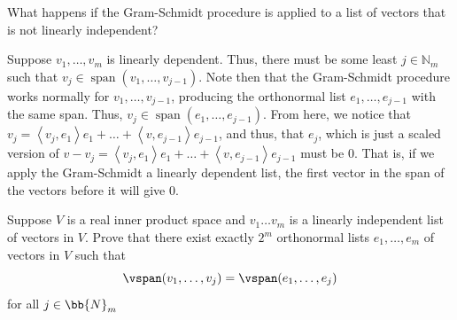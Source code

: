\documentclass[12pt, letterpaper]{hmcpset}
\begin{document}
\pagebreak

\begin{problem}[9]
	What happens if the Gram-Schmidt procedure is applied to a list of vectors that is not linearly independent?
\end{problem}

\begin{solution}
	Suppose $v_1, \dots, v_m$ is linearly dependent. Thus, there must be some least $j \in \mathbb N_m$ such that $v_j \in \operatorname{span}(v_1, \dots, v_{j - 1})$. Note then that the Gram-Schmidt procedure works normally for $v_1, \dots, v_{j - 1}$, producing the orthonormal list $e_1, \dots, e_{j - 1}$ with the same span. Thus, $v_j \in \operatorname{span}(e_1, \dots, e_{j - 1})$. From here, we notice that $v_j = \left < v_j, e_1 \right > e_1 + \dots + \left < v, e_{j - 1} \right > e_{j - 1}$, and thus, that $e_j$, which is just a scaled version of $v - v_j = \left < v_j, e_1 \right > e_1 + \dots + \left < v, e_{j - 1} \right > e_{j - 1}$ must be $0$. That is, if we apply the Gram-Schmidt a linearly dependent list, the first vector in the span of the vectors before it will give $0$.
\end{solution}

\pagebreak

\begin{problem}[10]
	Suppose $V$ is a real inner product space and $v_1 \ldots v_m$ is a linearly independent list of vectors in $V$. Prove that there exist exactly $2^m$ orthonormal lists $e_1, \ldots, e_m$ of vectors in $V$ such that
	\[
		\vspan (v_1, \ldots, v_j) = \vspan (e_1, \ldots, e_j)
	\]
	for all $j \in \bb{N}_m$
\end{problem}
\end{document}
